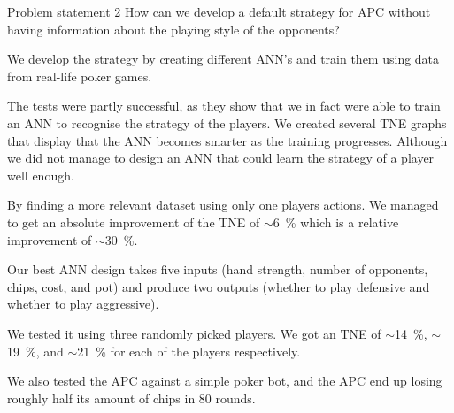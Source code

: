 \vspace{4mm}
\begin{statementBox2}{Problem statement 2}
How can we develop a default strategy for APC without having information about the playing style of the opponents?
\end{statementBox2}
\vspace{4mm}

We develop the strategy by creating different ANN's and train them using data from real-life poker games.

The tests were partly successful, as they show that we in fact were able to train an ANN to recognise the strategy of the players. We created several TNE graphs that display that the ANN becomes smarter as the training progresses. Although we did not manage to design an ANN that could learn the strategy of a player well enough.

By finding a more relevant dataset using only one players actions. We managed to get an absolute improvement of the TNE of $\sim$6~\% which is a relative improvement of $\sim$30~\%.

Our best ANN design takes five inputs (hand strength, number of opponents, chips, cost, and pot) and produce two outputs (whether to play defensive and whether to play aggressive). 

We tested it using three randomly picked players. We got an TNE of $\sim$14~\%, $\sim$19~\%, and $\sim$21~\% for each of the players respectively.

We also tested the APC against a simple poker bot, and the APC end up losing roughly half its amount of chips in 80 rounds.